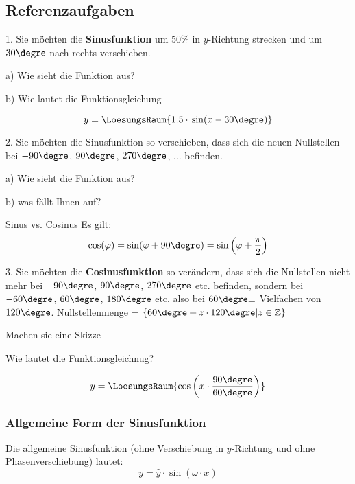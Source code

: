 \subsection{Referenzaufgaben}
1. Sie möchten die \textbf{Sinusfunktion} um 50\% in $y$-Richtung strecken und um
$30\degre$ nach rechts verschieben.

a) Wie sieht die Funktion aus?

\trigsysDsin{}

b) Wie lautet die Funktionsgleichung

$$y = \LoesungsRaum{1.5 \cdot{} \sin(x - 30\degre)}$$

2. Sie möchten die Sinusfunktion so verschieben, dass sich die neuen Nullstellen bei
$-90\degre$, $90\degre$, $270\degre$, ... befinden.

a) Wie sieht die Funktion aus?

\noTRAINER{\trigsysD{}}
\TRAINER{\trigsysDcos{}}

b) was fällt Ihnen auf?

\begin{gesetz}{Sinus vs. Cosinus}{}
  Es gilt: $$\cos(\varphi)=\sin(\varphi+90\degre)=\sin\left(\varphi + \frac\pi2\right)$$
\end{gesetz}
\newpage

3. Sie möchten die \textbf{Cosinusfunktion} so verändern, dass sich die
Nullstellen nicht mehr bei $-90\degre$, $90\degre$, $270\degre$
etc. befinden, sondern bei $-60\degre$, $60\degre$, $180\degre$
etc. also bei $60\degre \pm$ Vielfachen von
$120\degre$. Nullstellenmenge = $\{60\degre+z\cdot{}120\degre|
z\in\mathbb{Z}\}$

Machen sie eine Skizze

\trigsysDcos{}

Wie lautet die Funktionsgleichnug?

$$y = \LoesungsRaum{\cos\left(x\cdot\frac{90\degre}{60\degre}\right)}$$
\newpage




\subsubsection{Allgemeine Form der Sinusfunktion}

Die allgemeine Sinusfunktion (ohne Verschiebung in $y$-Richtung und
ohne Phasenverschiebung) lautet:
$$y=\hat{y}\cdot{}\sin(\omega\cdot{}x)$$

